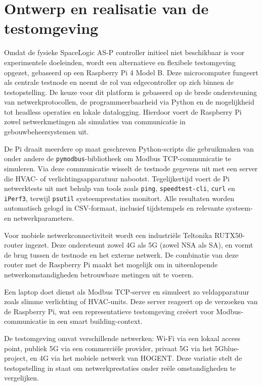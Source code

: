 \section{Ontwerp en realisatie van de testomgeving}

Omdat de fysieke SpaceLogic AS-P controller initieel niet beschikbaar is voor experimentele doeleinden, wordt een alternatieve en flexibele testomgeving opgezet, gebaseerd op een Raspberry Pi 4 Model B. Deze microcomputer fungeert als centrale testnode en neemt de rol van edgecontroller op zich binnen de testopstelling. De keuze voor dit platform is gebaseerd op de brede ondersteuning van netwerkprotocollen, de programmeerbaarheid via Python en de mogelijkheid tot headless operaties en lokale datalogging. Hierdoor voert de Raspberry Pi zowel netwerkmetingen als simulaties van communicatie in gebouwbeheersystemen uit.

De Pi draait meerdere op maat geschreven Python-scripts die gebruikmaken van onder andere de \texttt{pymodbus}-bibliotheek om Modbus TCP-communicatie te simuleren. Via deze communicatie wisselt de testnode gegevens uit met een server die HVAC- of verlichtingsapparatuur nabootst. Tegelijkertijd voert de Pi netwerktests uit met behulp van tools zoals \texttt{ping}, \texttt{speedtest-cli}, \texttt{curl} en \texttt{iPerf3}, terwijl \texttt{psutil} systeemprestaties monitort. Alle resultaten worden automatisch gelogd in CSV-formaat, inclusief tijdstempels en relevante systeem- en netwerkparameters.

Voor mobiele netwerkconnectiviteit wordt een industriële Teltonika RUTX50-router ingezet. Deze ondersteunt zowel 4G als 5G (zowel NSA als SA), en vormt de brug tussen de testnode en het externe netwerk. De combinatie van deze router met de Raspberry Pi maakt het mogelijk om in uiteenlopende netwerkomstandigheden betrouwbare metingen uit te voeren.

Een laptop doet dienst als Modbus TCP-server en simuleert zo veldapparatuur zoals slimme verlichting of HVAC-units. Deze server reageert op de verzoeken van de Raspberry Pi, wat een representatieve testomgeving creëert voor Modbus-communicatie in een smart building-context.

De testomgeving omvat verschillende netwerken: Wi-Fi via een lokaal access point, publiek 5G via een commerciële provider, privaat 5G via het 5Gblue-project, en 4G via het mobiele netwerk van HOGENT. Deze variatie stelt de testopstelling in staat om netwerkprestaties onder reële omstandigheden te vergelijken.


